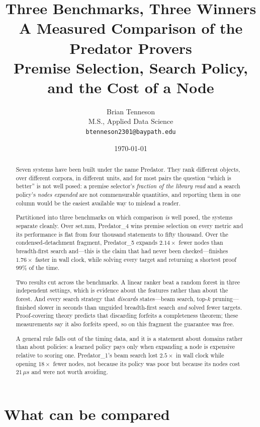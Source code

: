 \documentclass[11pt]{article}
\title{\textbf{Three Benchmarks, Three Winners}\\[4pt]
\large A Measured Comparison of the Predator Provers\\[2pt]
\normalsize Premise Selection, Search Policy, and the Cost of a Node}
\author{Brian Tenneson\\ \small M.S., Applied Data Science\\
\small \texttt{btenneson2301@baypath.edu}}
\date{\today}
\theoremstyle{plain}
\theoremstyle{definition}
\theoremstyle{remark}
\begin{document}
\maketitle

\begin{abstract}
Seven systems have been built under the name Predator. They rank different
objects, over different corpora, in different units, and for most pairs the
question ``which is better'' is not well posed: a premise selector's
\emph{fraction of the library read} and a search policy's \emph{nodes expanded}
are not commensurable quantities, and reporting them in one column would be the
easiest available way to mislead a reader.

Partitioned into three benchmarks on which comparison \emph{is} well posed, the
systems separate cleanly. Over set.mm, Predator\_4 wins premise selection on
every metric and its performance is flat from four thousand statements to fifty
thousand. Over the condensed-detachment fragment, Predator\_5 expands $2.14
\times$ fewer nodes than breadth-first search and---this is the claim that had
never been checked---finishes $1.76 \times$ faster in wall clock, while solving
every target and returning a shortest proof $99\%$ of the time.

Two results cut across the benchmarks. A linear ranker beat a random forest in
three independent settings, which is evidence about the features rather than
about the forest. And every search strategy that \emph{discards} states---beam
search, top-$k$ pruning---finished slower in seconds than unguided breadth-first
search \emph{and} solved fewer targets. Proof-covering theory predicts that
discarding forfeits a completeness theorem; these measurements say it also
forfeits speed, so on this fragment the guarantee was free.

A general rule falls out of the timing data, and it is a statement about domains
rather than about policies: a learned policy pays only when expanding a node is
expensive relative to scoring one. Predator\_1's beam search lost $2.5 \times$
in wall clock while opening $18 \times$ fewer nodes, not because its policy was
poor but because its nodes cost $21\,\mu s$ and were not worth avoiding.
\end{abstract}

\tableofcontents

\section{What can be compared}
\end{document}
